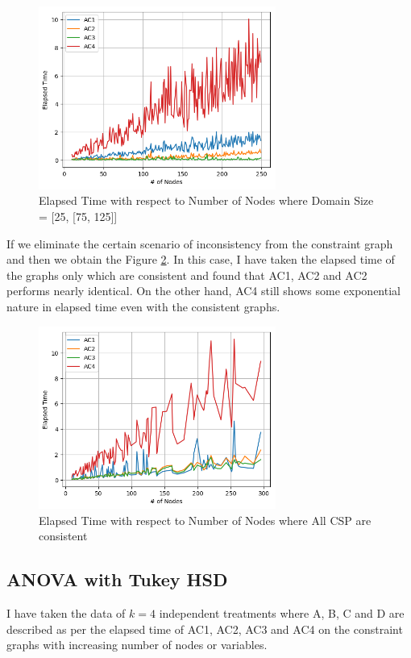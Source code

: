 \documentclass[10pt,twocolumn]{article}
\begin{document}
\begin{figure}[H]
	\includegraphics[width = \columnwidth, height = 6cm]{fig5}
	\caption{Elapsed Time with respect to Number of Nodes where Domain Size = [25, [75, 125]]}
	\label{fig:03}
\end{figure}
If we eliminate the certain scenario of inconsistency from the constraint graph and then we obtain the Figure \ref{fig:04}. In this case, I have taken the elapsed time of the graphs only which are consistent and found that AC1, AC2 and AC2 performs nearly identical. On the other hand, AC4 still shows some exponential nature in elapsed time even with the consistent graphs.
\begin{figure}[H]
	\includegraphics[width = \columnwidth, height = 6cm]{fig6}
	\caption{Elapsed Time with respect to Number of Nodes where All CSP are consistent}
	\label{fig:04}
\end{figure}

\subsection{ANOVA with Tukey HSD}
I have taken the data of $ k = 4 $ independent treatments where A, B, C and D are described as per the elapsed time of AC1, AC2, AC3 and AC4 on the constraint graphs with increasing number of nodes or variables.
\end{document}
